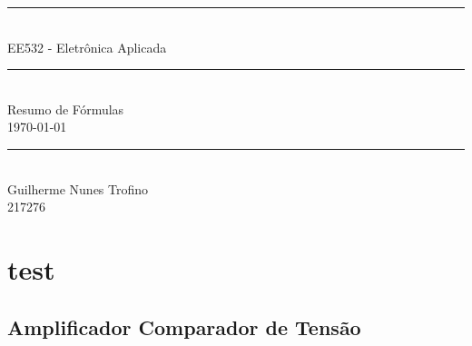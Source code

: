 \documentclass{article}
\begin{document}
    \begin{titlepage}
        \begin{center}
            \rule{450pt}{0.5pt}\\[4mm]
            {\Huge EE532 - Eletrônica Aplicada}\\
            \rule{450pt}{0.5pt}\\[2mm]
            {\Large Resumo de Fórmulas}\\[200mm]
            \today\\
            \rule{250pt}{0.5pt}\\
            {\large Guilherme Nunes Trofino}\\
            {\large 217276}\\
        \end{center}
    \end{titlepage}
\newpage

    \section{test}
    \subsection{Amplificador Comparador de Tensão}
\end{document}
